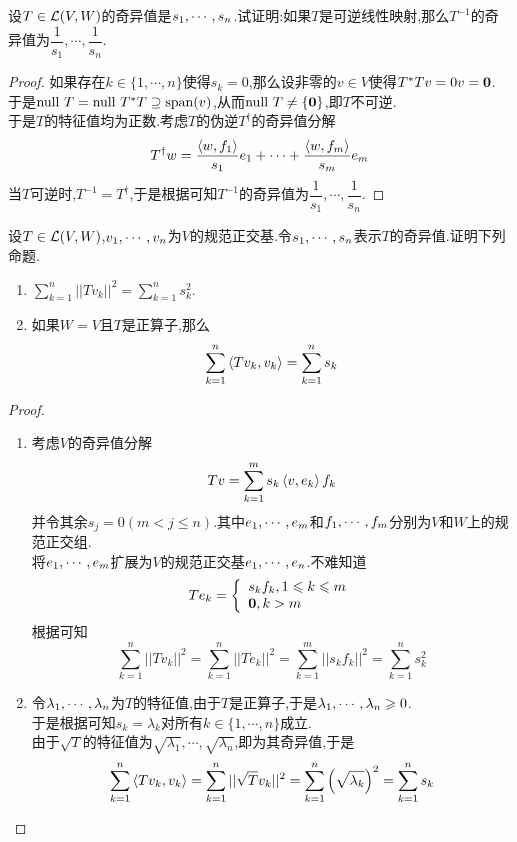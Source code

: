 \documentclass{ctexart}
\begin{document}
\begin{problem}[10.]
    设$T\in\mathcal{L}(V,W)$的奇异值是${s}_1,\cdots,{s}_{n}$.试证明:如果$T$是可逆线性映射,那么$T^{-1}$的奇异值为$\dfrac{1}{s_1},\cdots,\dfrac{1}{s_n}$.
\end{problem}
\begin{proof}
    如果存在$k\in\{1,\cdots,n\}$使得$s_k=0$,那么设非零的$v\in V$使得$T^*Tv=0v=\mathbf0$.\\
    于是$\text{null } T=\text{null } T^*T\supseteq\text{span}(v)$,从而$\text{null } T\neq\{\mathbf0\}$,即$T$不可逆.\\
    于是$T$的特征值均为正数.考虑$T$的伪逆$T^\dagger$的奇异值分解
    \[T^\dagger w=\dfrac{\left\langle{w},{f_1}\right\rangle}{s_1}e_1+\cdots+\dfrac{\left\langle{w},{f_m}\right\rangle}{s_m}e_m\]
    当$T$可逆时,$T^{-1}=T^\dagger$,于是根据可知$T^{-1}$的奇异值为$\dfrac{1}{s_1},\cdots,\dfrac{1}{s_n}$.
\end{proof}
\begin{problem}[11.]
    设$T\in\mathcal{L}(V,W)$,${v}_1,\cdots,{v}_{n}$为$V$的规范正交基.令${s}_1,\cdots,{s}_{n}$表示$T$的奇异值.证明下列命题.
    \begin{enumerate}[label=\tbf{(\arabic*)}]
        \item $\displaystyle\sum_{k=1}^{n}||Tv_k||^2=\sum_{k=1}^{n}s_k^2$.
        \item 如果$W=V$且$T$是正算子,那么
            \[\sum_{k=1}^{n}\left\langle{Tv_k},{v_k}\right\rangle=\sum_{k=1}^{n}s_k\]
    \end{enumerate}
\end{problem}
\begin{proof}
    \begin{enumerate}[label=\tbf{(\arabic*)}]
        \item 考虑$V$的奇异值分解
            \[Tv=\sum_{k=1}^{m}s_k\left\langle{v},{e_k}\right\rangle f_k\]
            并令其余$s_j=0(m<j\leqslant n)$.其中${e}_1,\cdots,{e}_{m}$和${f}_1,\cdots,{f}_{m}$分别为$V$和$W$上的规范正交组.\\
            将${e}_1,\cdots,{e}_{m}$扩展为$V$的规范正交基${e}_1,\cdots,{e}_{n}$.不难知道
            \[Te_k=\left\{\begin{array}{l}
                s_kf_k,1\leqslant k\leqslant m\\
                \mathbf0,k>m
            \end{array}\right.\]
            根据可知
            \[\sum_{k=1}^{n}||Tv_k||^2=\sum_{k=1}^{n}||Te_k||^2=\sum_{k=1}^{m}||s_kf_k||^2=\sum_{k=1}^{n}s_k^2\]
        \item 令${\lambda}_1,\cdots,{\lambda}_{n}$为$T$的特征值,由于$T$是正算子,于是${\lambda}_1,\cdots,{\lambda}_{n}\geqslant0$.\\
            于是根据可知$s_k=\lambda_k$对所有$k\in\{1,\cdots,n\}$成立.\\
            由于$\sqrt{T}$的特征值为$\sqrt{\lambda_1},\cdots,\sqrt{\lambda_n}$,即为其奇异值,于是
            \[\sum_{k=1}^{n}\left\langle{Tv_k},{v_k}\right\rangle=\sum_{k=1}^{n}||\sqrt{T}v_k||^2=\sum_{k=1}^{n}\left(\sqrt{\lambda_k}\right)^2=\sum_{k=1}^{n}s_k\]
    \end{enumerate}
\end{proof}
\end{document}
